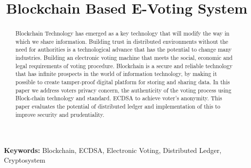 \documentclass{article}
\title{Blockchain Based E-Voting System}
\begin{document}
\maketitle
\begin{abstract}
Blockchain Technology has emerged as a key technology that will modify the way in which we share information. Building trust in distributed environments without the need for authorities is a technological advance that has the potential to change many industries.
Building an electronic voting machine that meets the social, economic and legal requirements of voting procedure. Blockchain is a secure and reliable technology that has infinite prospects in the world of information technology, by making it possible to create tamper-proof digital platform for storing and sharing data. In this paper we address voters privacy concern, the authenticity of the voting process using Block-chain technology and standard. ECDSA to achieve voter's anonymity. This paper evaluates the potential of distributed ledger and implementation of this to improve security and prudentiality.
\end{abstract}
\textbf{Keywords:} Blockchain, ECDSA, Electronic Voting, Distributed Ledger, Cryptosystem
\end{document}

